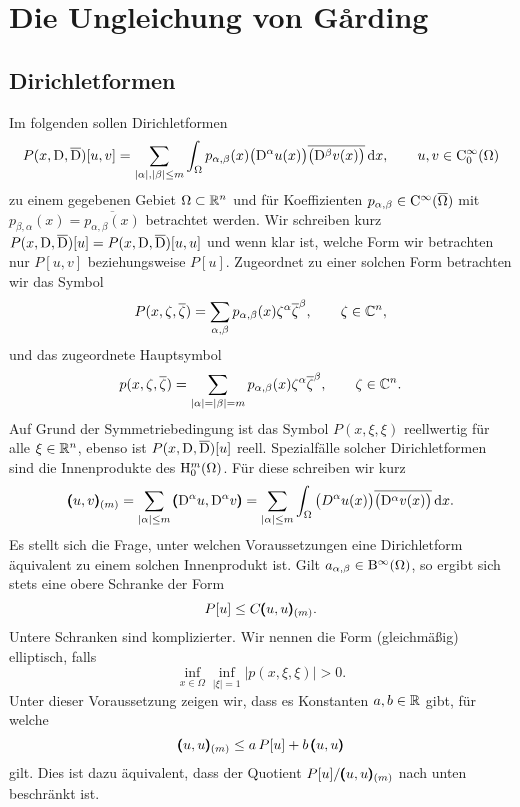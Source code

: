 \chapter{Die Ungleichung von G\r{a}rding}

\section{Dirichletformen}
Im folgenden sollen Dirichletformen 
\begin{equation}
   P(x,\mathrm D,\overline{\mathrm D})[u,v] = \sum_{|\alpha|,|\beta|\le m} \int_\Omega p_{\alpha,\beta}(x) \big(\mathrm D^\alpha u(x)\big) \overline{\big(\mathrm D^\beta v(x)\big)} \,\mathrm d x,\qquad u,v\in\mathrm C_0^\infty(\Omega)
\end{equation}
zu einem gegebenen Gebiet $\Omega\subset\mathbb R^n$ und für Koeffizienten $p_{\alpha,\beta}\in\mathrm C^\infty(\overline{\Omega})$ mit $p_{\beta,\alpha}(x)=\overline{p_{\alpha,\beta}(x)}$  betrachtet werden. Wir schreiben kurz $P(x,\mathrm D,\overline{\mathrm D})[u]=P(x,\mathrm D,\overline{\mathrm D})[u,u]$ und wenn klar ist, welche Form wir betrachten nur $P[u,v]$ beziehungsweise $P[u]$. Zugeordnet zu einer solchen Form betrachten wir das Symbol
\begin{equation}
   P(x,\zeta,\overline\zeta) = \sum_{\alpha,\beta} p_{\alpha,\beta}(x) \zeta^\alpha\overline\zeta^\beta,\qquad \zeta\in\mathbb C^n,
\end{equation}
und das zugeordnete Hauptsymbol
\begin{equation}
   p(x,\zeta,\overline\zeta) = \sum_{|\alpha|=|\beta|=m} p_{\alpha,\beta}(x) \zeta^\alpha\overline\zeta^\beta,\qquad \zeta\in\mathbb C^n.
\end{equation}
Auf Grund der Symmetriebedingung ist das Symbol $P(x,\xi,\xi)$ reellwertig f\"ur alle $\xi\in\mathbb R^n$, ebenso ist 
$P(x,\mathrm D,\overline {\mathrm D})[u]$ reell. Spezialfälle solcher Dirichletformen sind die Innenprodukte des $\mathrm H^m_0(\Omega)$. Für diese schreiben wir kurz
\begin{equation}
  \pmb(u,v\pmb)_{(m)} = \sum_{|\alpha|\le m} \pmb(\mathrm D^\alpha u,\mathrm D^\alpha v\pmb) = \sum_{|\alpha|\le m} \int_\Omega   \big(D^\alpha u(x)\big) \overline{\big(\mathrm D^\alpha v(x)\big)} \,\mathrm d x.
\end{equation}
Es stellt sich die Frage, unter welchen Voraussetzungen eine Dirichletform äquivalent zu einem solchen Innenprodukt ist. Gilt $a_{\alpha,\beta}\in \mathrm B^\infty(\Omega)$, so ergibt sich stets eine obere Schranke der Form
\begin{equation}
    P[u] \le C \pmb(u,u\pmb)_{(m)}.
\end{equation}
Untere Schranken sind komplizierter. Wir nennen die Form (gleichmäßig) elliptisch, falls 
\begin{equation}
  \inf_{x\in\Omega}  \inf_{|\xi|=1} |p(x,\xi,\xi)| > 0.
\end{equation}
Unter dieser Voraussetzung zeigen wir, dass es Konstanten $a,b\in\mathbb R$ gibt, für welche
\begin{equation} 
   \pmb(u,u\pmb)_{(m)} \le a\, P[u] + b\, \pmb(u,u\pmb)
\end{equation}
gilt. Dies ist dazu äquivalent, dass der Quotient $P [u]  / \pmb(u,u\pmb)_{(m)}$ nach unten beschränkt ist.

